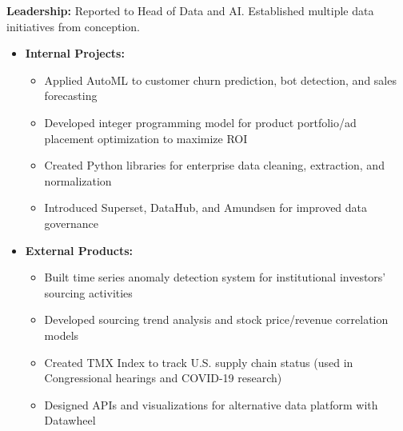 \documentclass[12pt,a4paper,sans]{moderncv}
\begin{document}
{
    \textbf{Leadership:} Reported to Head of Data and AI. Established multiple data initiatives from conception.
    \begin{itemize}
        \item \textbf{Internal Projects:}
        \begin{itemize}
            \item Applied AutoML to customer churn prediction, bot detection, and sales forecasting
            \item Developed integer programming model for product portfolio/ad placement optimization to maximize ROI
            \item Created Python libraries for enterprise data cleaning, extraction, and normalization
            \item Introduced Superset, DataHub, and Amundsen for improved data governance
        \end{itemize}
        \item \textbf{External Products:}
        \begin{itemize}
            \item Built time series anomaly detection system for institutional investors' sourcing activities
            \item Developed sourcing trend analysis and stock price/revenue correlation models
            \item Created TMX Index to track U.S. supply chain status (used in Congressional hearings and COVID-19 research)
            \item Designed APIs and visualizations for alternative data platform with Datawheel
        \end{itemize}
    \end{itemize}
}
\end{document}
